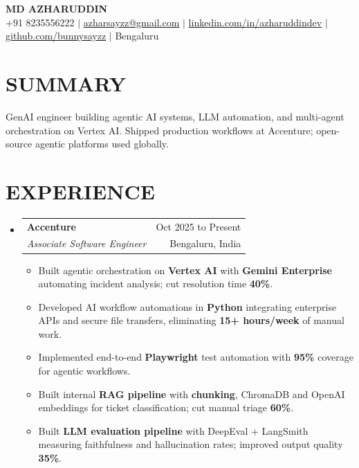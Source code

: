 \documentclass[a4paper,11pt]{article}
\makeatletter
\newcommand{\resumeItem}[1]{
  \item\small{{#1 \vspace{-4pt}}}
}
\newcommand{\resumeSubheading}[4]{
  \vspace{-2pt}\item
    \begin{tabular*}{\textwidth}[t]{l@{\extracolsep{\fill}}r}
      \textbf{#1} & {\color{dark-grey}\small #2}\vspace{0pt}\\
      \textit{#3} & {\color{dark-grey} \small #4}\\
    \end{tabular*}\vspace{-6pt}
}
\newcommand{\resumeSubHeadingListStart}{\begin{itemize}[leftmargin=0in, label={}]}
\newcommand{\resumeSubHeadingListEnd}{\end{itemize}\vspace{-6pt}}
\newcommand{\resumeItemListStart}{\begin{itemize}[label=\textbullet]}
\newcommand{\resumeItemListEnd}{\end{itemize}\vspace{-8pt}}
\makeatother
\begin{document}
\begin{center}
    \textbf{\Huge MD AZHARUDDIN} \\ \vspace{3pt}
    \small +91 8235556222 $|$ \href{mailto:azharsayzz@gmail.com}{azharsayzz@gmail.com} $|$ \href{https://linkedin.com/in/azharuddindev}{linkedin.com/in/azharuddindev} $|$ \href{https://github.com/bunnysayzz}{github.com/bunnysayzz} $|$ Bengaluru
    \\ \vspace{-5pt}
\end{center}

\section{SUMMARY}
\begin{itemize}[leftmargin=0in, label={}]
    \small{\item{
     GenAI engineer building agentic AI systems, LLM automation, and multi-agent orchestration on Vertex AI. Shipped production workflows at Accenture; open-source agentic platforms used globally.
    }}
\end{itemize}\vspace{-8pt}

\section{EXPERIENCE}
  \resumeSubHeadingListStart
    \resumeSubheading
      {Accenture}{Oct 2025 to Present}
      {Associate Software Engineer}{Bengaluru, India}
      \resumeItemListStart
        \resumeItem{Built agentic orchestration on \textbf{Vertex AI} with \textbf{Gemini Enterprise} automating incident analysis; cut resolution time \textbf{40\%}.}
        \resumeItem{Developed AI workflow automations in \textbf{Python} integrating enterprise APIs and secure file transfers, eliminating \textbf{15+ hours/week} of manual work.}
        \resumeItem{Implemented end-to-end \textbf{Playwright} test automation with \textbf{95\%} coverage for agentic workflows.}
        \resumeItem{Built internal \textbf{RAG pipeline} with \textbf{chunking}, ChromaDB and OpenAI embeddings for ticket classification; cut manual triage \textbf{60\%}.}
        \resumeItem{Built \textbf{LLM evaluation pipeline} with DeepEval + LangSmith measuring faithfulness and hallucination rates; improved output quality \textbf{35\%}.}
      \resumeItemListEnd
  \resumeSubHeadingListEnd
\end{document}
